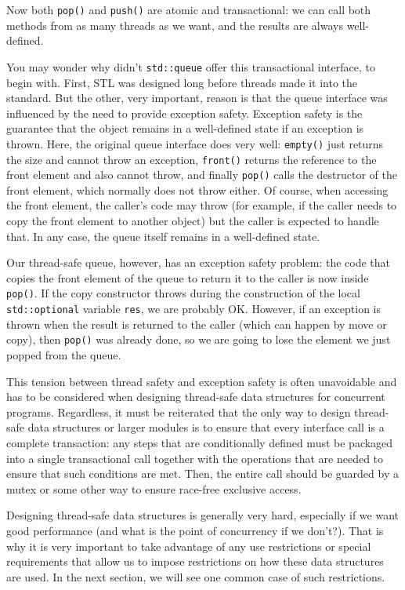 Now both \texttt{pop()} and \texttt{push()} are atomic and transactional: we can call both methods from as many threads as we want, and the results are always well-defined.

You may wonder why didn't \texttt{std::queue} offer this transactional interface, to begin with. First, STL was designed long before threads made it into the standard. But the other, very important, reason is that the queue interface was influenced by the need to provide exception safety. Exception safety is the guarantee that the object remains in a well-defined state if an exception is thrown. Here, the original queue interface does very well: \texttt{empty()} just returns the size and cannot throw an exception, \texttt{front()} returns the reference to the front element and also cannot throw, and finally \texttt{pop()} calls the destructor of the front element, which normally does not throw either. Of course, when accessing the front element, the caller's code may throw (for example, if the caller needs to copy the front element to another object) but the caller is expected to handle that. In any case, the queue itself remains in a well-defined state.

Our thread-safe queue, however, has an exception safety problem: the code that copies the front element of the queue to return it to the caller is now inside \texttt{pop()}. If the copy constructor throws during the construction of the local \texttt{std::optional} variable \texttt{res}, we are probably OK. However, if an exception is thrown when the result is returned to the caller (which can happen by move or copy), then \texttt{pop()} was already done, so we are going to lose the element we just popped from the queue.

This tension between thread safety and exception safety is often unavoidable and has to be considered when designing thread-safe data structures for concurrent programs. Regardless, it must be reiterated that the only way to design thread-safe data structures or larger modules is to ensure that every interface call is a complete transaction: any steps that are conditionally defined must be packaged into a single transactional call together with the operations that are needed to ensure that such conditions are met. Then, the entire call should be guarded by a mutex or some other way to ensure race-free exclusive access.

Designing thread-safe data structures is generally very hard, especially if we want good performance (and what is the point of concurrency if we don't?). That is why it is very important to take advantage of any use restrictions or special requirements that allow us to impose restrictions on how these data structures are used. In the next section, we will see one common case of such restrictions.

